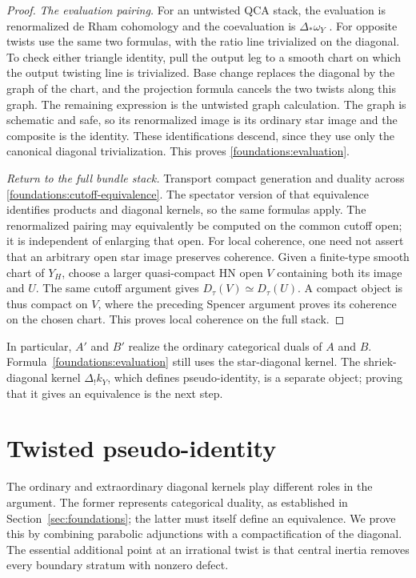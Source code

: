 \documentclass[11pt]{article}
\numberwithin{equation}{section}
\theoremstyle{definition}
\theoremstyle{remark}
\begin{document}
\begin{proof}
\emph{The evaluation pairing.}
For an untwisted QCA stack, the evaluation is renormalized de Rham
cohomology and the coevaluation is $\Delta_*\omega_Y$
\cite[Sections~8.4 and~9.1]{DrinfeldGaitsgoryFiniteness}.
For opposite twists use the same two formulas, with the ratio line
trivialized on the diagonal.  To check either triangle identity, pull
the output leg to a smooth chart on which the output twisting line is
trivialized.  Base change replaces the diagonal by the graph of the
chart, and the projection formula cancels the two twists along this
graph.  The remaining expression is the untwisted graph calculation.
The graph is schematic and safe, so its renormalized image is its
ordinary star image and the composite is the identity.  These
identifications descend, since they use only the canonical diagonal
trivialization.  This proves \eqref{foundations:evaluation}.

\emph{Return to the full bundle stack.}
Transport compact generation and duality across
\eqref{foundations:cutoff-equivalence}.  The spectator version of that
equivalence identifies products and diagonal kernels, so the same
formulas apply.  The renormalized pairing may equivalently be computed
on the common cutoff open; it is independent of enlarging that open.
For local coherence, one need not assert that an arbitrary open star
image preserves coherence.  Given a finite-type smooth chart of $Y_H$,
choose a larger quasi-compact HN open $V$ containing both its image and
$U$.  The same cutoff argument gives $D_\tau(V)\simeq D_\tau(U)$.
A compact object is thus compact on $V$, where the preceding Spencer
argument proves its coherence on the chosen chart.  This proves local
coherence on the full stack.
\end{proof}

In particular, $A'$ and $B'$ realize the ordinary categorical duals of
$A$ and $B$.  Formula~\eqref{foundations:evaluation} still uses the
star-diagonal kernel.  The shriek-diagonal kernel
$\Delta_!k_Y$, which defines pseudo-identity, is a separate object;
proving that it gives an equivalence is the next step.

\section{Twisted pseudo-identity}\label{sec:pseudoidentity}

The ordinary and extraordinary diagonal kernels play different roles in the
argument.  The former represents categorical duality, as established in
Section~\ref{sec:foundations}; the latter must itself define an equivalence.
We prove this by combining parabolic adjunctions with a compactification of
the diagonal.  The essential additional point at an irrational twist is that
central inertia removes every boundary stratum with nonzero defect.
\end{document}
